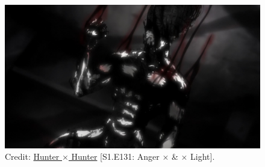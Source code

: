 \documentclass[12pt,oneside]{book}
\begin{document}
\begin{figure}[H]
	\centering
	\includegraphics[width = 12cm]{Gon_berserk}
	\caption{Credit: \href{https://www.imdb.com/title/tt3748420/}{Hunter $\times$ Hunter} [S1.E131: Anger $\times$ \& $\times$ Light].}
\end{figure}
\end{document}

